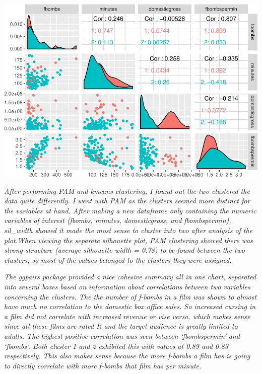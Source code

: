 \documentclass[]{article}
\begin{document}
\begin{center}\includegraphics{project1.ethanpieniazekweb_files/figure-latex/unnamed-chunk-16-4} \end{center}

\emph{After performing PAM and kmeans clustering, I found out the two
clustered the data quite differently. I went with PAM as the clusters
seemed more distinct for the variables at hand. After making a new
dataframe only containing the numeric variables of interest (fbombs,
minutes, domesticgross, and fbombspermin), sil\_width showed it made the
most sense to cluster into two after analysis of the plot.When viewing
the separate silhouette plot, PAM clustering showed there was strong
structure (average silhouette width = 0.78) to be found between the two
clusters, so most of the values belonged to the clusters they were
assigned.}

\emph{The ggpairs package provided a nice cohesive summary all in one
chart, separated into several boxes based on information about
correlations between two variables concerning the clusters. The the
number of f-bombs in a film was shown to almost have much no correlation
to the domestic box office sales. So increased cursing in a film did not
correlate with increased revenue or vise versa, which makes sense since
all these films are rated R and the target audience is greatly limited
to adults. The highest positive correlation was seen between
`fbombspermin' and `fbombs'. Both cluster 1 and 2 exhibited this with
values at 0.89 and 0.83 respectively. This also makes sense because the
more f-bombs a film has is going to directly correlate with more f-bombs
that film has per minute.}
\end{document}
